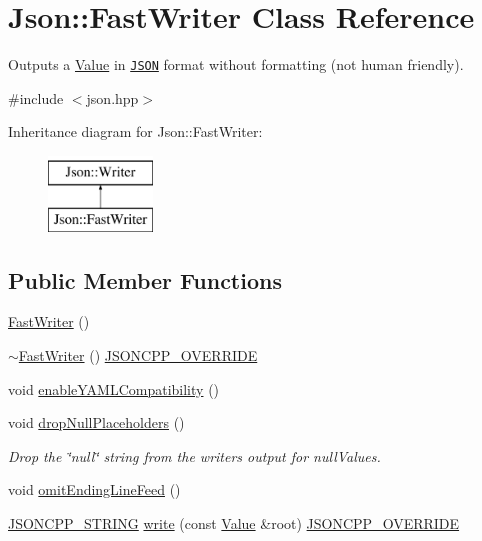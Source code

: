 \hypertarget{classJson_1_1FastWriter}{}\section{Json\+:\+:Fast\+Writer Class Reference}
\label{classJson_1_1FastWriter}


Outputs a \hyperlink{classJson_1_1Value}{Value} in \href{http://www.json.org}{\tt J\+S\+ON} format without formatting (not human friendly).  




{\ttfamily \#include $<$json.\+hpp$>$}

Inheritance diagram for Json\+:\+:Fast\+Writer\+:\begin{figure}[H]
\begin{center}
\leavevmode
\includegraphics[height=2.000000cm]{classJson_1_1FastWriter}
\end{center}
\end{figure}
\subsection*{Public Member Functions}
\begin{DoxyCompactItemize}
\item 
\hyperlink{classJson_1_1FastWriter_a1bbc73ce1a1cc7b09cd1e02db3905170}{Fast\+Writer} ()
\item 
\hyperlink{classJson_1_1FastWriter_a34152eac509fe00c9b2e15ce2fc94ab8}{$\sim$\+Fast\+Writer} () \hyperlink{json_8hpp_a824d6199c91488107e443226fa6022c5}{J\+S\+O\+N\+C\+P\+P\+\_\+\+O\+V\+E\+R\+R\+I\+DE}
\item 
void \hyperlink{classJson_1_1FastWriter_a78d98e9f76d33660ad6e6a1abe287d45}{enable\+Y\+A\+M\+L\+Compatibility} ()
\item 
void \hyperlink{classJson_1_1FastWriter_a6e93d8dce951e408517311026a065b40}{drop\+Null\+Placeholders} ()
\begin{DoxyCompactList}\small\item\em Drop the \char`\"{}null\char`\"{} string from the writer\textquotesingle{}s output for null\+Values. \end{DoxyCompactList}\item 
void \hyperlink{classJson_1_1FastWriter_af4ee077d365d75941fb2688d97207a55}{omit\+Ending\+Line\+Feed} ()
\item 
\hyperlink{json_8hpp_a1e723f95759de062585bc4a8fd3fa4be}{J\+S\+O\+N\+C\+P\+P\+\_\+\+S\+T\+R\+I\+NG} \hyperlink{classJson_1_1FastWriter_a93d45ba4bc312371d08beb3e3dfbe654}{write} (const \hyperlink{classJson_1_1Value}{Value} \&root) \hyperlink{json_8hpp_a824d6199c91488107e443226fa6022c5}{J\+S\+O\+N\+C\+P\+P\+\_\+\+O\+V\+E\+R\+R\+I\+DE}
\end{DoxyCompactItemize}
